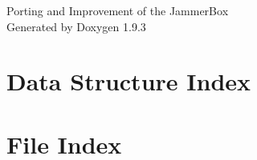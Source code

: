 \documentclass[twoside]{book}
\newcommand{\+}{\discretionary{\mbox{\scriptsize$\hookleftarrow$}}{}{}}
\newcommand{\clearemptydoublepage}{%
    \newpage{\pagestyle{empty}\cleardoublepage}%
  }
\begin{document}
  \raggedbottom
    \hypersetup{pageanchor=false,
                bookmarksnumbered=true,
                pdfencoding=unicode
               }
  \begin{titlepage}
  \vspace*{7cm}
  \begin{center}%
  {\Large Porting and Improvement of the Jammer\+Box}\\
  \vspace*{1cm}
  {\large Generated by Doxygen 1.9.3}\\
  \end{center}
  \end{titlepage}
  \clearemptydoublepage
  \tableofcontents
  \clearemptydoublepage
  \hypersetup{pageanchor=true}
\chapter{Data Structure Index}

\chapter{File Index}

\end{document}
